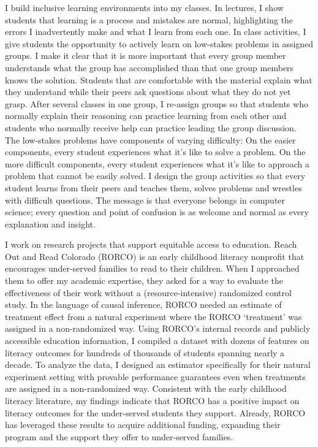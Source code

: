 \documentclass[11pt]{article}
\begin{document}
I build inclusive learning environments into my classes. In lectures, I show students that learning is a process and mistakes are normal, highlighting the errors I inadvertently make and what I learn from each one. In class activities, I give students the opportunity to actively learn on low-stakes problems in assigned groups. I make it clear that it is more important that every group member understands what the group has accomplished than that one group members knows the solution. Students that are comfortable with the material explain what they understand while their peers ask questions about what they do not yet grasp. After several classes in one group, I re-assign groups so that students who normally explain their reasoning can practice learning from each other and students who normally receive help can practice leading the group discussion. The low-stakes problems have components of varying difficulty: On the easier components, every student experiences what it's like to solve a problem. On the more difficult components, every student experiences what it's like to approach a problem that cannot be easily solved. I design the group activities so that every student learns from their peers and teaches them, solves problems and wrestles with difficult questions. The message is that everyone belongs in computer science; every question and point of confusion is as welcome and normal as every explanation and insight.

I work on research projects that support equitable access to education. Reach Out and Read Colorado (RORCO) is an early childhood literacy nonprofit that encourages under-served families to read to their children. When I approached them to offer my academic expertise, they asked for a way to evaluate the effectiveness of their work without a (resource-intensive) randomized control study. In the language of causal inference, RORCO needed an estimate of treatment effect from a natural experiment where the RORCO `treatment' was assigned in a non-randomized way. Using RORCO's internal records and publicly accessible education information, I compiled a dataset with dozens of features on literacy outcomes for hundreds of thousands of students spanning nearly a decade. To analyze the data, I designed an estimator specifically for their natural experiment setting with provable performance guarantees even when treatments are assigned in a non-randomized way. Consistent with the early childhood literacy literature, my findings indicate that RORCO has a positive impact on literacy outcomes for the under-served students they support. Already, RORCO has leveraged these results to acquire additional funding, expanding their program and the support they offer to under-served families.
\end{document}
